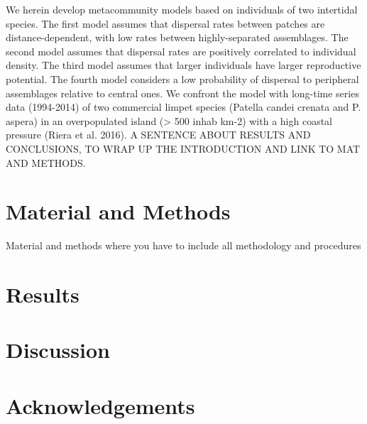 \documentclass[12pt]{article}
\begin{document}
We herein develop metacommunity models based on individuals of two intertidal species. The first model assumes that dispersal rates between patches are distance-dependent, with low rates between highly-separated assemblages. The second model assumes that dispersal rates are positively correlated to individual density. The third model assumes that larger individuals have larger reproductive potential. The fourth model considers a low probability of dispersal to peripheral assemblages relative to central ones.
We confront the model with long-time series data (1994-2014) of two commercial limpet species (Patella candei crenata and P. aspera) in an overpopulated island (> 500 inhab km-2) with a high coastal pressure (Riera et al. 2016). A SENTENCE ABOUT RESULTS AND CONCLUSIONS, TO WRAP UP THE INTRODUCTION AND LINK TO MAT AND METHODS.

\section{Material and Methods}

Material and methods where you have to include all methodology and procedures

\section{Results}

\section{Discussion}

\section{Acknowledgements}
\end{document}
